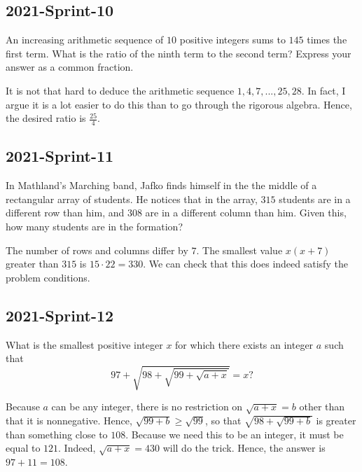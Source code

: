 \documentclass[12pt]{article}
\begin{document}
\subsection*{2021-Sprint-10}
An increasing arithmetic sequence of $10$ positive integers sums to $145$ times the first term. What is the ratio of the ninth term to the second term? Express your answer as a common fraction.
\begin{answer}
It is not that hard to deduce the arithmetic sequence $1, 4, 7, ..., 25, 28$. In fact, I argue it is a lot easier to do this than to go through the rigorous algebra. Hence, the desired ratio is $\boxed{\frac{25}{4}}$.
\end{answer}

\subsection*{2021-Sprint-11}
In Mathland's Marching band, Jafko finds himself in the the middle of a rectangular array of students. He notices that in the array, $315$ students are in a different row than him, and $308$ are in a different column than him. Given this, how many students are in the formation?
\begin{answer}
The number of rows and columns differ by $7$. The smallest value $x(x+7)$ greater than $315$ is $15\cdot 22 = \boxed{330}$. We can check that this does indeed satisfy the problem conditions.
\end{answer}

\subsection*{2021-Sprint-12}
What is the smallest positive integer $x$ for which there exists an integer $a$ such that $$97+\sqrt{98+\sqrt{99+\sqrt{a+x}}}=x?$$
\begin{answer}
Because $a$ can be any integer, there is no restriction on $\sqrt{a+x} = b$ other than that it is nonnegative. Hence, $\sqrt{99+b} \ge \sqrt{99}$, so that $\sqrt{98+\sqrt{99+b}}$ is greater than something close to $108$. Because we need this to be an integer, it must be equal to $121$. Indeed, $\sqrt{a+x} = 430$ will do the trick. Hence, the answer is $97+11=\boxed{108}$.
\end{answer}
\end{document}
